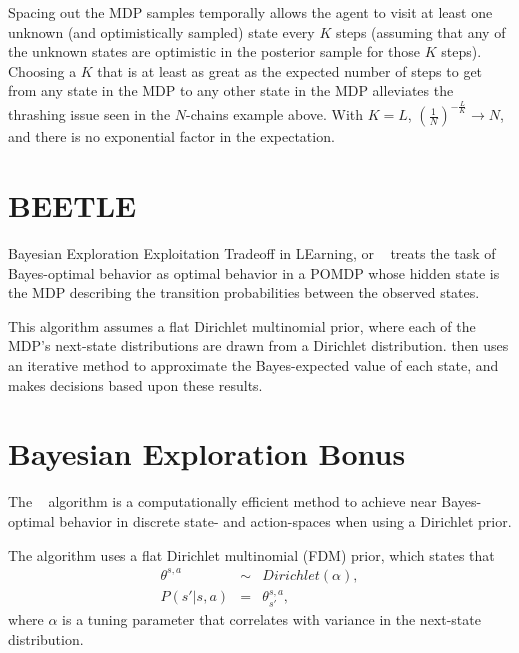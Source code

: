 Spacing out the MDP samples temporally allows the agent to visit at least one unknown (and optimistically sampled) state every $K$ steps (assuming that any of the unknown states are optimistic in the posterior sample for those $K$ steps). Choosing a $K$ that is at least as great as the expected number of steps to get from any state in the MDP to any other state in the MDP alleviates the thrashing issue seen in the $N$-chains example above. With $K=L$, $(\frac 1 N)^{-\frac L K} \rightarrow N$, and there is no exponential factor in the expectation.


\section{BEETLE}

Bayesian Exploration Exploitation Tradeoff in LEarning, or ~\cite{poupart06} treats the task of Bayes-optimal behavior as optimal behavior in a POMDP whose hidden state is the MDP describing the transition probabilities between the observed states.

This algorithm assumes a flat Dirichlet multinomial prior, where each of the MDP's next-state distributions are drawn from a Dirichlet distribution.  then uses an iterative method  to approximate the Bayes-expected value of each state, and makes decisions based upon these results. 





\section{Bayesian Exploration Bonus}

The ~\cite{kolter09} algorithm is a computationally efficient method to achieve near Bayes-optimal behavior in discrete state- and action-spaces when using a Dirichlet prior.

The algorithm uses a flat Dirichlet multinomial (FDM) prior, which states that
\begin{eqnarray}
\theta^{s,a}&\sim&Dirichlet(\alpha),\\
P(s'|s,a)&=&\theta^{s,a}_{s'},
\end{eqnarray}
where $\alpha$ is a tuning parameter that correlates with variance in the next-state distribution.

